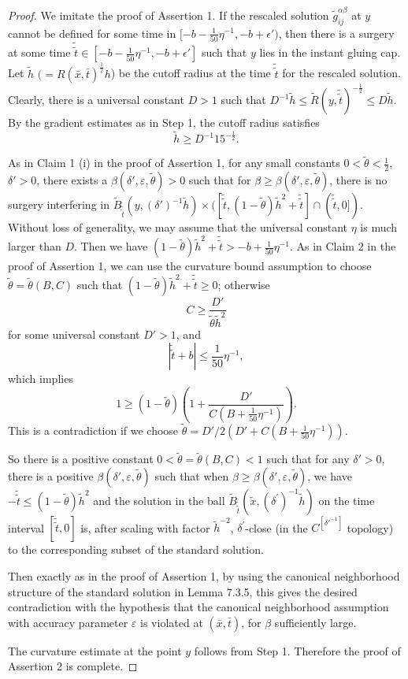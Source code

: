 \begin{proof}
We imitate the proof of
Assertion 1. If the rescaled solution
$\widetilde{g}^{\alpha\beta}_{ij}$ at $y$ cannot be defined for
some time in $[-b-\frac{1}{50}\eta^{-1},-b+\epsilon')$, then there
is a surgery at some time $\tilde{\tilde{t}} \in
[-b-\frac{1}{50}\eta^{-1},-b+\epsilon']$ such that $y$ lies in the
instant gluing cap.  Let $\tilde{h}$
$(=R(\bar{x},\bar{t})^{\frac{1}{2}}h$) be the cutoff radius at the
time $\tilde{\tilde{t}}$ for the rescaled solution. Clearly, there
is a universal constant $D>1$ such that
${D}^{-1}\tilde{h}\leq\widetilde{R}(y,\tilde{\tilde{t}})^{-\frac{1}{2}}
\leq D\tilde{h}$. By the gradient estimates as in Step 1, the
cutoff radius satisfies
$$
\tilde{h} \geq D^{-1}15^{-\frac{1}{2}}.
$$

As in Claim 1 (i) in the proof of Assertion 1, for any small
constants $0<\tilde{\theta}<\frac{1}{2}$, $\delta'>0$, there
exists a $\beta(\delta',\varepsilon, \tilde{\theta})> 0$ such that
for $\beta \geq \beta(\delta',\varepsilon, \tilde{\theta})$, there
is no surgery interfering in
$\widetilde{B}_{\tilde{\tilde{t}}}(y,(\delta')^{-1}\tilde{h})\times
([\tilde{\tilde{t}},(1-\tilde{\theta})\tilde{h}^{2}
+\tilde{\tilde{t}}]\cap(\tilde{\tilde{t}},0])$. Without loss of
generality, we may assume that the universal constant $\eta$ is
much larger than $D$. Then we have
$(1-\tilde{\theta})\tilde{h}^{2}
+\tilde{\tilde{t}}>-b+\frac{1}{50}\eta^{-1}$. As in Claim 2 in the
proof of Assertion 1, we can use the curvature bound assumption to
choose $\tilde{\theta}=\tilde{\theta}(B,C)$ such that
$(1-\tilde{\theta})\tilde{h}^{2} +\tilde{\tilde{t}}\geq 0$;
otherwise
$$
C\geq\frac{D'}{\tilde{\theta}\tilde{h}^{2}}
$$
for some universal constant $D'>1$, and
$$
|\tilde{\tilde{t}}+b|\leq \frac{1}{50}\eta^{-1},
$$
which implies
$$
1\geq(1-\tilde{\theta})\left(1+\frac{D'}{C\left(B+\frac{1}{50}\eta^{-1}\right)}\right).
$$
This is a contradiction if we choose
$\tilde{\theta}={D'}/{2(D'+C(B+\frac{1}{50}\eta^{-1}))}$.

So there is a positive constant $0
<\tilde{\theta}=\tilde{\theta}(B,C)<1$ such that for any
$\delta'>0$, there is a positive $\beta(\delta',\varepsilon,
\tilde{\theta})$ such that when $\beta \geq
\beta(\delta',\varepsilon, \tilde{\theta})$, we have
$-\tilde{\tilde{t}}\leq (1-\tilde{\theta})\tilde{h}^{2}$  and the
solution in the ball $\widetilde{B}_{\tilde{\tilde{t}}}(\tilde{x},
{(\delta^{\prime})}^{-1}\tilde{h})$ on the time interval
$[\tilde{\tilde{t}},0]$ is, after scaling with factor
$\tilde{h}^{-2}$, ${\delta}^{\prime}$-close (in the
$C^{[\delta'^{-1}]}$ topology) to the corresponding subset of the
standard solution.

Then exactly as in the proof of Assertion 1, by using the
canonical neighborhood structure of the standard solution in Lemma
7.3.5, this gives the desired contradiction with the hypothesis
that the canonical neighborhood assumption with accuracy parameter
$\varepsilon$ is violated at $(\bar{x},\bar{t})$, for $\beta$
sufficiently large.

The curvature estimate at the point $y$ follows from Step 1.
Therefore the proof of Assertion 2 is complete.
\end{proof}

